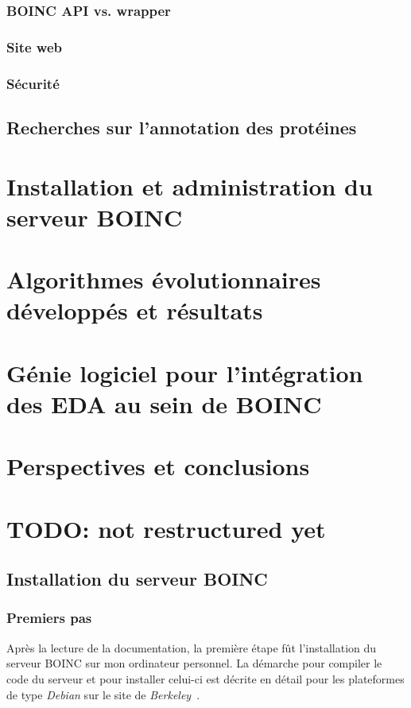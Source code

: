 \documentclass[a4paper, 11pt]{report}
\begin{document}
\subsection{BOINC API vs. wrapper}


\subsection{Site web}

\subsection{Sécurité}


\section{Recherches sur l'annotation des protéines}

\chapter{Installation et administration du serveur \textsc{BOINC}}

\chapter{Algorithmes évolutionnaires développés et résultats}

\chapter{Génie logiciel pour l'intégration des EDA au sein de \textsc{BOINC}}

\chapter{Perspectives et conclusions}

\chapter{TODO: not restructured yet}
\section{Installation du serveur BOINC}

\subsection{Premiers pas}
Après la lecture de la documentation, la première étape fût l'installation du serveur \textsc{BOINC} sur mon ordinateur personnel. La démarche pour compiler le code du serveur et pour installer celui-ci est décrite en détail pour les plateformes de type \textit{Debian} sur le site de \textit{Berkeley}~\cite{BOINC}.
\end{document}
